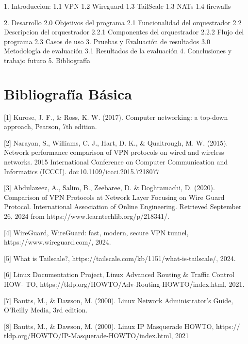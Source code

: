 \documentclass{article}
\begin{document}
1. Introduccion:
    1.1 VPN
    1.2 Wireguard
    1.3 TailScale
    1.3 NATs
    1.4 firewalls

2. Desarrollo
    2.0 Objetivos del programa
    2.1 Funcionalidad del orquestrador
    2.2 Descripcion del orquestrador
    2.2.1 Componentes del orquestrador
    2.2.2 Flujo del programa
    2.3 Casos de uso
3. Pruebas y Evaluación de resultados 
    3.0 Metodología de evaluación
    3.1 Resultados de la evaluación
4. Conclusiones y trabajo futuro 
5. Bibliografía 

\section{Bibliografía Básica}
[1] Kurose, J. F., & Ross, K. W. (2017). Computer networking: a top-down approach,
Pearson, 7th edition.

[2] Narayan, S., Williams, C. J., Hart, D. K., & Qualtrough, M. W. (2015). Network performance comparison of VPN protocols on wired and wireless networks. 2015 International Conference on Computer Communication and Informatics (ICCCI). doi:10.1109/iccci.2015.7218077

[3]  Abdulazeez, A., Salim, B., Zeebaree, D. & Doghramachi, D. (2020). Comparison of VPN Protocols at Network Layer Focusing on Wire Guard Protocol. International Association of Online Engineering. Retrieved September 26, 2024 from https://www.learntechlib.org/p/218341/. 

[4] WireGuard, WireGuard: fast, modern, secure VPN tunnel, https://www.wireguard.com/, 2024.

[5] What is Tailscale?, https://tailscale.com/kb/1151/what-is-tailscale/, 2024.

[6] Linux Documentation Project, Linux Advanced Routing & Traffic Control HOW-
TO, https://tldp.org/HOWTO/Adv-Routing-HOWTO/index.html, 2021.

[7] Bautts, M., & Dawson, M. (2000). Linux Network Administrator’s Guide, O’Reilly
Media, 3rd edition.

[8] Bautts, M., & Dawson, M. (2000). Linux IP Masquerade HOWTO, https://
tldp.org/HOWTO/IP-Masquerade-HOWTO/index.html, 2021
\end{document}
